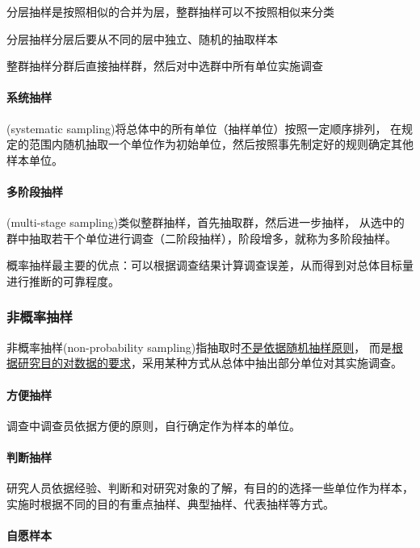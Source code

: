 \documentclass[UTF8,10pt]{book}
\begin{document}
    分层抽样是按照相似的合并为层，整群抽样可以不按照相似来分类
    
    分层抽样分层后要从不同的层中独立、随机的抽取样本
    
    整群抽样分群后直接抽样群，然后对中选群中所有单位实施调查

    \paragraph{系统抽样}

    (systematic sampling)将总体中的所有单位（抽样单位）按照一定顺序排列，
    在规定的范围内随机抽取一个单位作为初始单位，然后按照事先制定好的规则确定其他样本单位。

    \paragraph{多阶段抽样}

    (multi-stage sampling)类似整群抽样，首先抽取群，然后进一步抽样，
    从选中的群中抽取若干个单位进行调查（二阶段抽样），阶段增多，就称为多阶段抽样。

    概率抽样最主要的优点：可以根据调查结果计算调查误差，从而得到对总体目标量进行推断的可靠程度。

    \subsubsection{非概率抽样}

    非概率抽样(non-probability sampling)指抽取时\underline{不是依据随机抽样原则}，
    而是\underline{根据研究目的对数据的要求}，采用某种方式从总体中抽出部分单位对其实施调查。
    
    \paragraph{方便抽样}

    调查中调查员依据方便的原则，自行确定作为样本的单位。

    \paragraph{判断抽样}

    研究人员依据经验、判断和对研究对象的了解，有目的的选择一些单位作为样本，
    实施时根据不同的目的有重点抽样、典型抽样、代表抽样等方式。

    \paragraph{自愿样本}
\end{document}
